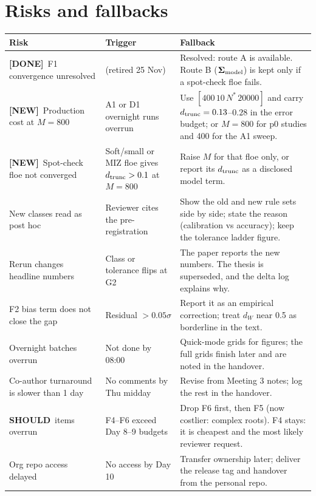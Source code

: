 \documentclass[10pt,a4paper]{article}
\newcommand{\SHOULD}{\textcolor{should}{\textbf{SHOULD}}}
\newcommand{\DONE}{\textcolor{done}{\textbf{[DONE]}}}
\newcommand{\NEW}{\textcolor{ocean}{\textbf{[NEW]}}}
\begin{document}
\section{Risks and fallbacks}
\begin{center}\small
\begin{tabularx}{\linewidth}{@{}l L L@{}}
\toprule
Risk & Trigger & Fallback \\
\midrule
\DONE\ F1 convergence unresolved & (retired 25 Nov) & Resolved: route A is available. Route B ($\boldsymbol\Sigma_{\rm model}$) is kept only if a spot-check floe fails. \\
\NEW\ Production cost at $M=800$ & A1 or D1 overnight runs overrun & Use $[400\,10\,N^*\,20000]$ and carry $d_{\rm trunc}=0.13$--$0.28$ in the error budget; or $M=800$ for p0 studies and 400 for the A1 sweep. \\
\NEW\ Spot-check floe not converged & Soft/small or MIZ floe gives $d_{\rm trunc}>0.1$ at $M=800$ & Raise $M$ for that floe only, or report its $d_{\rm trunc}$ as a disclosed model term. \\
New classes read as post hoc & Reviewer cites the pre-registration & Show the old and new rule sets side by side; state the reason (calibration vs accuracy); keep the tolerance ladder figure. \\
Rerun changes headline numbers & Class or tolerance flips at G2 & The paper reports the new numbers. The thesis is superseded, and the delta log explains why. \\
F2 bias term does not close the gap & Residual $>0.05\sigma$ & Report it as an empirical correction; treat $d_W$ near 0.5 as borderline in the text. \\
Overnight batches overrun & Not done by 08:00 & Quick-mode grids for figures; the full grids finish later and are noted in the handover. \\
Co-author turnaround is slower than 1 day & No comments by Thu midday & Revise from Meeting 3 notes; log the rest in the handover. \\
\SHOULD\ items overrun & F4--F6 exceed Day 8--9 budgets & Drop F6 first, then F5 (now costlier: complex roots). F4 stays: it is cheapest and the most likely reviewer request. \\
Org repo access delayed & No access by Day 10 & Transfer ownership later; deliver the release tag and handover from the personal repo. \\
\bottomrule
\end{tabularx}
\end{center}
\end{document}
